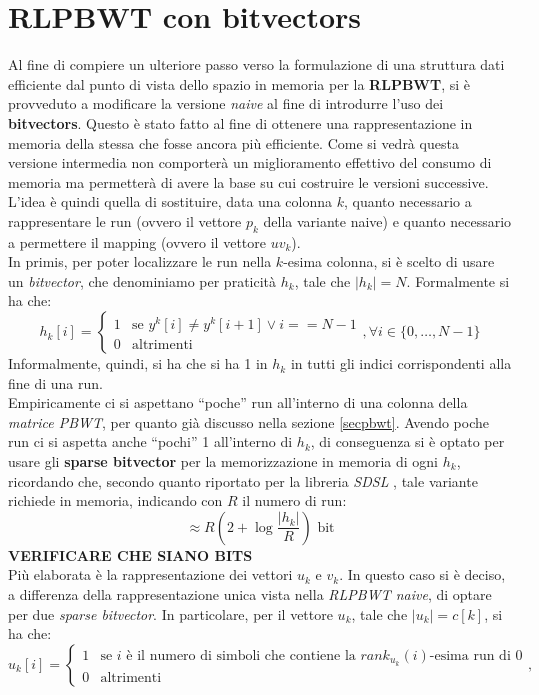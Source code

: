 \section{RLPBWT con bitvectors}
Al fine di compiere un ulteriore passo verso la formulazione di una struttura
dati efficiente dal punto di vista dello spazio in memoria per la
\textbf{RLPBWT}, si è provveduto a modificare la versione \textit{naive} al fine
di introdurre l'uso dei \textbf{bitvectors}. Questo è stato fatto al fine di
ottenere una rappresentazione in memoria della stessa che fosse ancora più
efficiente. Come si vedrà questa versione intermedia non comporterà un
miglioramento effettivo del consumo di memoria ma permetterà di avere la base su
cui costruire le versioni successive.\\
L'idea è quindi quella di sostituire, data una colonna $k$, quanto necessario a
rappresentare le run (ovvero il vettore $p_k$ della variante naive) e quanto
necessario a permettere il mapping (ovvero il vettore $uv_k$).\\
In primis, per poter localizzare le run nella $k$-esima colonna, si è scelto di
usare un \textit{bitvector}, che denominiamo per praticità $h_k$, tale che
$|h_k|=N$. Formalmente si ha che:
\[h_k[i]=
  \begin{cases}
    1&\mbox{se } y^k[i]\neq y^k[i+1]\lor i==N-1\\
    0&\mbox{altrimenti}
  \end{cases},\forall i\in \{0,\ldots,N-1\}
\]
Informalmente, quindi, si ha che si ha 1 in $h_k$ in tutti gli indici
corrispondenti alla fine di una run.\\
Empiricamente ci si aspettano ``poche'' run all'interno di una colonna della
\textit{matrice PBWT}, per quanto già discusso nella sezione
\ref{secpbwt}. Avendo poche run ci si aspetta anche ``pochi'' 1 all'interno di
$h_k$, di conseguenza si è optato per usare gli \textbf{sparse bitvector} per la
memorizzazione in memoria di ogni $h_k$, ricordando che, secondo quanto
riportato per la libreria \textit{SDSL} \cite{sdsl}, tale variante richiede in
memoria, indicando con $R$ il numero di run:
\[\approx R\left(2+\log\frac{|h_k|}{R}\right)\mbox{ bit}\]
\textbf{VERIFICARE CHE SIANO BITS}\\
Più elaborata è la rappresentazione dei vettori $u_k$ e $v_k$. In questo caso si
è deciso, a differenza della rappresentazione unica vista nella \textit{RLPBWT
  naive}, di optare per due \textit{sparse bitvector}. In particolare, per il
vettore $u_k$, tale che $|u_k|=c[k]$, si ha che:
\[u_k[i]=
  \begin{cases}
    1&\mbox{se }i \mbox{ è il numero di simboli che contiene la
    }rank_{u_k}(i)\mbox{-esima run di 0}\\
    0&\mbox{altrimenti}
  \end{cases},
\]
